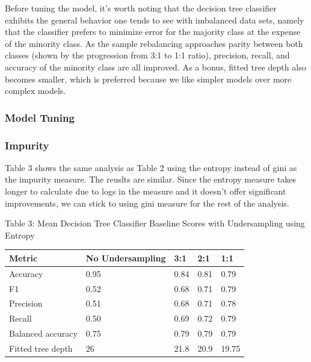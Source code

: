 \documentclass{article}
\begin{document}
Before tuning the model, it's worth noting that the decision tree classifier exhibits the general behavior one tends to see with imbalanced data sets, namely that the classifier prefers to minimize error for the majority class at the expense of the minority class. As the sample rebalancing approaches parity between both classes (shown by the progression from 3:1 to 1:1 ratio), precision, recall, and accuracy of the minority class are all improved. As a bonus, fitted tree depth also becomes smaller, which is preferred because we like simpler models over more complex models. \newline

\subsubsection*{Model Tuning}
\subsubsection*{Impurity}
Table 3 shows the same analysis as Table 2 using the entropy instead of gini as the impurity measure. The reuslts are similar. Since the entropy measure takes longer to calculate due to logs in the measure and it doesn't offer significant improvements, we can stick to using gini measure for the rest of the analysis.

\begin{table}
	\centering
	Table 3: Mean Decision Tree Classifier Baseline Scores with Undersampling using Entropy
	\begin{tabular}{ l l l l l }
		\hline
		Metric & No Undersampling\footnote[1] & 3:1 \footnote[2] & 2:1 & 1:1 \\
		\hline
		Accuracy & 0.95 & 0.84 & 0.81 & 0.79 \\
		F1 & 0.52 & 0.68 & 0.71 & 0.79 \\
		Precision & 0.51 & 0.68 & 0.71 & 0.78 \\
		Recall & 0.50 & 0.69 & 0.72 & 0.79 \\
		Balanced accuracy & 0.75 & 0.79 & 0.79 & 0.79 \\
		Fitted tree depth & 26 & 21.8 & 20.9 & 19.75\\
		\hline 
		
		
	\end{tabular}
\end{table}
\end{document}
